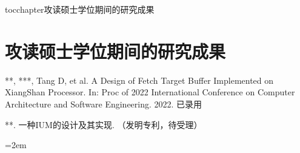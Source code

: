 
\newenvironment{thepublications}{\wuhao\song}

\addcontentsline{toc}{chapter}{攻读硕士学位期间的研究成果}%
\chapter*{\centering\xiaosan\hei\bfseries 攻读硕士学位期间的研究成果}

\begin{thepublications}

\setlength{\parindent}{0em}
\begin{publist}
	\item ***, ***, Tang D, et al. A Design of Fetch Target Buffer Implemented on XiangShan Processor. In: Proc of 2022 International Conference on Computer Architecture and Software Engineering. 2022. 已录用
	\item ***. 一种IUM的设计及其实现. （发明专利，待受理）
\end{publist}

\vfill
{}\hangindent=2em\noindent

\setlength{\parindent}{2em}

\end{thepublications}

